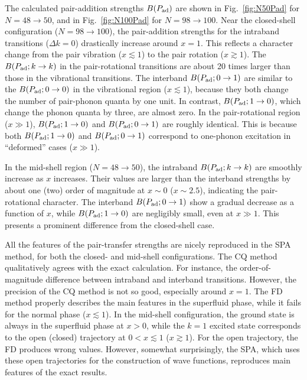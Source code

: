 \documentclass[11pt]{book} %
\begin{document}
The calculated pair-addition strengths $B(P_{\rm ad})$ are shown in
Fig.~\ref{fig:N50Pad} for $N=48\rightarrow 50$,
and in Fig.~\ref{fig:N100Pad} for $N=98\rightarrow 100$.
Near the closed-shell configuration ($N=98\rightarrow 100$),
the pair-addition strengths for the intraband transitions ($\Delta k=0$)
drastically increase around $x=1$.
This reflects a character change from the pair vibration ($x\lesssim 1$)
to the pair rotation ($x\gtrsim 1$).
The $B(P_{\rm ad}; k\rightarrow k)$ in the pair-rotational transitions
are about 20 times larger than those in the vibrational transitions.
The interband $B(P_{\rm ad}; 0\rightarrow 1)$ are similar to
the $B(P_{\rm ad}; 0\rightarrow 0)$ in the vibrational region
($x\lesssim 1$), because they both change the number of pair-phonon quanta
by one unit.
In contrast, $B(P_{\rm ad}; 1\rightarrow 0)$, which change the phonon
quanta by three, are almost zero.
In the pair-rotational region ($x \gg 1$),
$B(P_{\rm ad}; 1\rightarrow 0)$ and $B(P_{\rm ad}; 0\rightarrow 1)$
are roughly identical. This is because both $B(P_{\rm ad}; 1\rightarrow 0)$ 
and $B(P_{\rm ad}; 0\rightarrow 1)$ correspond to one-phonon excitation
in ``deformed'' cases ($x \gg 1$).

In the mid-shell region ($N=48\rightarrow 50$),
the intraband $B(P_{\rm ad}; k\rightarrow k)$ are smoothly increase as
$x$ increases.
Their values are larger than the interband strengths by about one (two) order
of magnitude at $x\sim 0$ ($x\sim 2.5$),
indicating the pair-rotational character.
The interband $B(P_{\rm ad}; 0\rightarrow 1)$ show a gradual decrease
as a function of $x$, while
$B(P_{\rm ad}; 1\rightarrow 0)$ are negligibly small,
even at $x\gg 1$.
This presents a prominent difference from the closed-shell case.

All the features of the pair-transfer strengths
are nicely reproduced in the SPA method,
for both the closed- and mid-shell configurations.
The CQ method qualitatively agrees with the exact calculation.
For instance, the order-of-magnitude difference between intraband
and interband transitions.
However, the precision of the CQ method is not so good,
especially around $x=1$.
The FD method properly describes the main features
in the superfluid phase, while it fails for the normal phase
($x\lesssim 1$). 
In the mid-shell configuration, the ground state is always
in the superfluid phase at $x>0$,
while the $k=1$ excited state corresponds to
the open (closed) trajectory at $0<x\lesssim 1$ ($x\gtrsim 1$).
For the open trajectory, the FD produces wrong values.
However, somewhat surprisingly,
the SPA, which uses these open trajectories for the construction
of wave functions,
reproduces main features of the exact results.
\end{document}
